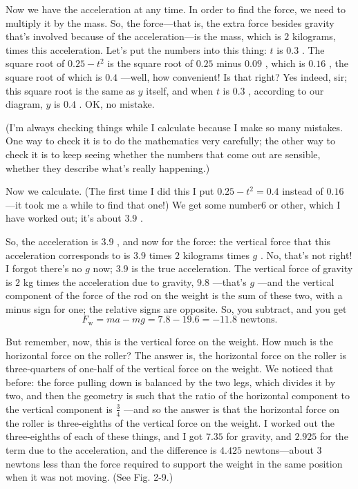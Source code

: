 \documentclass[11pt,oneside]{article}
\begin{document}
Now we have the acceleration at any time. In order to find the force, we need to multiply it by the mass. So, the force---that is, the extra force besides gravity that's involved because of the acceleration---is the mass, which is \(2\) kilograms, times this acceleration. Let's put the numbers into this thing: \(t\) is \(0.3\) . The square root of \(0.25-t^2\) is the square root of \(0.25\) minus \(0.09\) , which is \(0.16\) , the square root of which is \(0.4\) ---well, how convenient! Is that right? Yes indeed, sir; this square root is the same as \(y\) itself, and when \(t\) is \(0.3\) , according to our diagram, \(y\) is \(0.4\) . OK, no mistake.\par

(I'm always checking things while I calculate because I make so many mistakes. One way to check it is to do the mathematics very carefully; the other way to check it is to keep seeing whether the numbers that come out are sensible, whether they describe what's really happening.)\par

Now we calculate. (The first time I did this I put \(0.25-t^2 = 0.4\) instead of \(0.16\) ---it took me a while to find that one!) We get some number6 or other, which I have worked out; it's about \(3.9\) .\par

So, the acceleration is \(3.9\) , and now for the force: the vertical force that this acceleration corresponds to is \(3.9\) times \(2\) kilograms times \(g\) . No, that's not right! I forgot there's no \(g\) now; \(3.9\) is the true acceleration. The vertical force of gravity is \(2\) kg times the acceleration due to gravity, \(9.8\) ---that's \(g\) ---and the vertical component of the force of the rod on the weight is the sum of these two, with a minus sign for one; the relative signs are opposite. So, you subtract, and you get 
\begin{equation*} \tag{2.20}
\label{Eq:TIPS:2:20} F_\text{w} = ma-mg = 7.8-19.6 = -11.8 \text{ newtons.} \end{equation*}
\par

But remember, now, this is the vertical force on the weight. How much is the horizontal force on the roller? The answer is, the horizontal force on the roller is three-quarters of one-half of the vertical force on the weight. We noticed that before: the force pulling down is balanced by the two legs, which divides it by two, and then the geometry is such that the ratio of the horizontal component to the vertical component is \(\frac34\) ---and so the answer is that the horizontal force on the roller is three-eighths of the vertical force on the weight. I worked out the three-eighths of each of these things, and I got \(7.35\) for gravity, and \(2.925\) for the term due to the acceleration, and the difference is \(4.425\) newtons---about \(3\) newtons less than the force required to support the weight in the same position when it was not moving. (See Fig. 2-9.)\par
\end{document}
